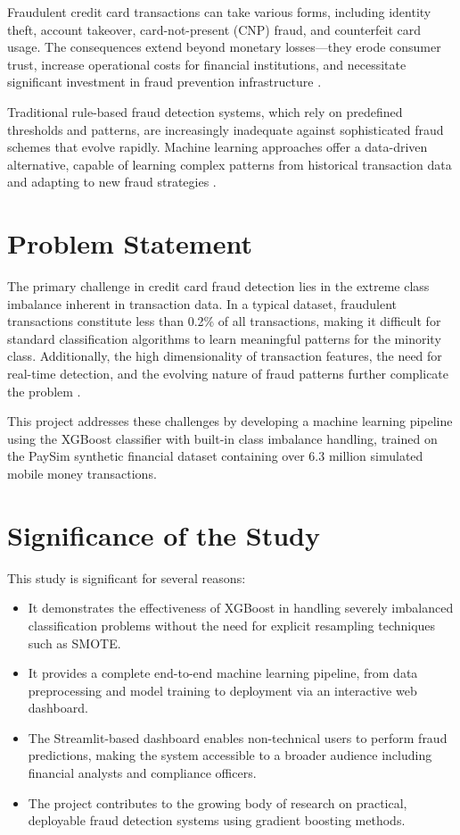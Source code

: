\documentclass[12pt,a4paper]{report}
\begin{document}
Fraudulent credit card transactions can take various forms, including identity theft, account takeover, card-not-present (CNP) fraud, and counterfeit card usage. The consequences extend beyond monetary losses---they erode consumer trust, increase operational costs for financial institutions, and necessitate significant investment in fraud prevention infrastructure \cite{dal2014learned}.

Traditional rule-based fraud detection systems, which rely on predefined thresholds and patterns, are increasingly inadequate against sophisticated fraud schemes that evolve rapidly. Machine learning approaches offer a data-driven alternative, capable of learning complex patterns from historical transaction data and adapting to new fraud strategies \cite{awoyemi2017credit}.

\section{Problem Statement}

The primary challenge in credit card fraud detection lies in the extreme class imbalance inherent in transaction data. In a typical dataset, fraudulent transactions constitute less than 0.2\% of all transactions, making it difficult for standard classification algorithms to learn meaningful patterns for the minority class. Additionally, the high dimensionality of transaction features, the need for real-time detection, and the evolving nature of fraud patterns further complicate the problem \cite{pozzolo2015calibrating}.

This project addresses these challenges by developing a machine learning pipeline using the XGBoost classifier with built-in class imbalance handling, trained on the PaySim synthetic financial dataset containing over 6.3 million simulated mobile money transactions.

\section{Significance of the Study}

This study is significant for several reasons:

\begin{itemize}
    \item It demonstrates the effectiveness of XGBoost in handling severely imbalanced classification problems without the need for explicit resampling techniques such as SMOTE.
    \item It provides a complete end-to-end machine learning pipeline, from data preprocessing and model training to deployment via an interactive web dashboard.
    \item The Streamlit-based dashboard enables non-technical users to perform fraud predictions, making the system accessible to a broader audience including financial analysts and compliance officers.
    \item The project contributes to the growing body of research on practical, deployable fraud detection systems using gradient boosting methods.
\end{itemize}
\end{document}
